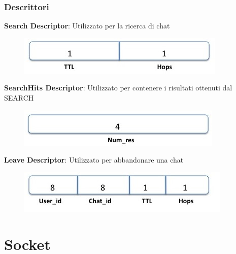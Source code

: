 \documentclass[a4paper,italian,12pt]{beamer}
\begin{document}
    		\begin{frame}
    			\frametitle{Descrittori}
	    			\textbf{Search Descriptor}: Utilizzato per la ricerca di chat
    				\begin{figure}[H]
						\includegraphics[scale=0.3]{etc/search.jpg}
					\end{figure}					
					\textbf{SearchHits Descriptor}: Utilizzato per contenere i risultati ottenuti dal SEARCH
    				\begin{figure}[H]
						\includegraphics[scale=0.3]{etc/searchhits.jpg}
					\end{figure}					
					\textbf{Leave Descriptor}: Utilizzato per abbandonare una chat
    				\begin{figure}[H]
						\includegraphics[scale=0.3]{etc/leave.jpg}
					\end{figure}
			\end{frame}
	
	\section{Socket}
\end{document}
